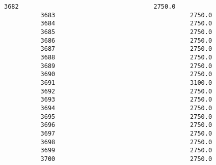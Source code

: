 \documentclass[11pt]{article}
\begin{document}
\begin{Verbatim}[commandchars=\\\{\}]
          3682                                     2750.0   
          3683                                     2750.0   
          3684                                     2750.0   
          3685                                     2750.0   
          3686                                     2750.0   
          3687                                     2750.0   
          3688                                     2750.0   
          3689                                     2750.0   
          3690                                     2750.0   
          3691                                     3100.0   
          3692                                     2750.0   
          3693                                     2750.0   
          3694                                     2750.0   
          3695                                     2750.0   
          3696                                     2750.0   
          3697                                     2750.0   
          3698                                     2750.0   
          3699                                     2750.0   
          3700                                     2750.0   
          

\end{Verbatim}
\end{document}
